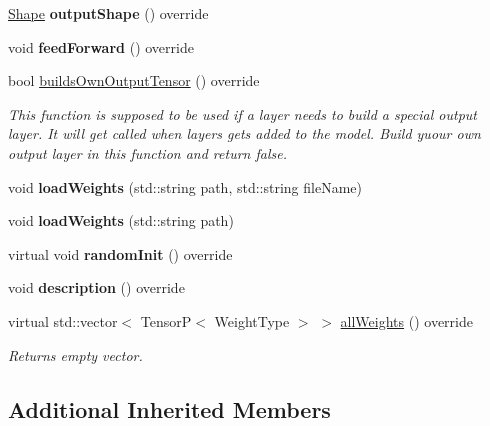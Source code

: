 \begin{DoxyCompactItemize}
\mbox{\label{classFlatten_a263fe8a5f24154851f64fdb64520e40a}} 
\hyperlink{classShape}{Shape} {\bfseries output\+Shape} () override
\item 
\mbox{\label{classFlatten_aed12736c802bdf7cb6b3530f1e581b35}} 
void {\bfseries feed\+Forward} () override
\item 
bool \hyperlink{classFlatten_a53379945e182152effef9456b32eb65a}{builds\+Own\+Output\+Tensor} () override
\begin{DoxyCompactList}\small\item\em This function is supposed to be used if a layer needs to build a special output layer. It will get called when layers gets added to the model. Build yuour own output layer in this function and return false. \end{DoxyCompactList}\item 
\mbox{\label{classFlatten_aa24e68c4f410565483161c7214556d9d}} 
void {\bfseries load\+Weights} (std\+::string path, std\+::string file\+Name)
\item 
\mbox{\label{classFlatten_a0eee4c2e4f98bf2a4d19b9283b8f47f7}} 
void {\bfseries load\+Weights} (std\+::string path)
\item 
\mbox{\label{classFlatten_a4c95c3512c62bc6e82d13515447515f8}} 
virtual void {\bfseries random\+Init} () override
\item 
\mbox{\label{classFlatten_a8c35a22fe96db562180199193cc79b5c}} 
void {\bfseries description} () override
\item 
\mbox{\label{classFlatten_ac7d8cd2d0e206e1cacb71e66ec4ec3e3}} 
virtual std\+::vector$<$ TensorP$<$ Weight\+Type $>$ $>$ \hyperlink{classFlatten_ac7d8cd2d0e206e1cacb71e66ec4ec3e3}{all\+Weights} () override
\begin{DoxyCompactList}\small\item\em Returns empty vector. \end{DoxyCompactList}\end{DoxyCompactItemize}
\subsection*{Additional Inherited Members}


